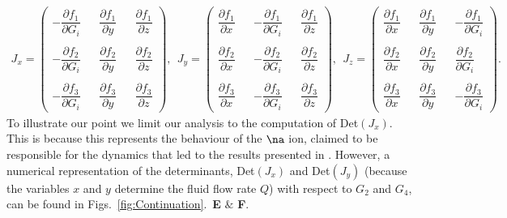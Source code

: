 { \small
\begin{align*}
J_x=\begin{pmatrix}
-\dfrac{\partial f_1}{\partial G_i} && \dfrac{\partial f_1}{\partial y} && \dfrac{\partial f_1}{\partial z} \\
\\
-\dfrac{\partial f_2}{\partial G_i} && \dfrac{\partial f_2}{\partial y} && \dfrac{\partial f_2}{\partial z} \\
\\
-\dfrac{\partial f_3}{\partial G_i} && \dfrac{\partial f_3}{\partial y} && \dfrac{\partial f_3}{\partial z}
\end{pmatrix},
\ \
J_y=
\begin{pmatrix}
\dfrac{\partial f_1}{\partial x} && -\dfrac{\partial f_1}{\partial G_i} && \dfrac{\partial f_1}{\partial z} \\
\\
\dfrac{\partial f_2}{\partial x} && -\dfrac{\partial f_2}{\partial G_i} && \dfrac{\partial f_2}{\partial z} \\
\\
\dfrac{\partial f_3}{\partial x} && -\dfrac{\partial f_3}{\partial G_i} && \dfrac{\partial f_3}{\partial z}
\end{pmatrix},
\ \
J_z=
\begin{pmatrix}
\dfrac{\partial f_1}{\partial x} && \dfrac{\partial f_1}{\partial y} && - \dfrac{\partial f_1}{\partial G_i} \\
\\
\dfrac{\partial f_2}{\partial x} && \dfrac{\partial f_2}{\partial y} &&\dfrac{\partial f_2}{\partial G_i} \\
\\
\dfrac{\partial f_3}{\partial x} && \dfrac{\partial f_3}{\partial y} && -\dfrac{\partial f_3}{\partial G_i}
\end{pmatrix}.
\end{align*}
}
\clearpage
To illustrate our point we limit our analysis to the computation of Det$(J_x)$. This is because this represents the behaviour of the $\na$ ion, claimed to be responsible for the dynamics that led to the results presented in \cite{siguenza2017Ae4}. However, a numerical representation of the determinants, Det$(J_x)$ and Det$(J_y)$ (because the variables $x$ and $y$ determine the fluid flow rate $Q$) with respect to $G_2$ and $G_4$, can be found in Figs.~\ref{fig:Continuation}.~\textbf{E} $\&$ \textbf{F}.\\

